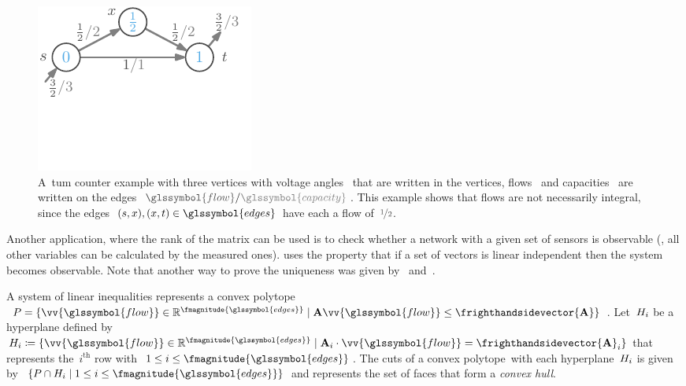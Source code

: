 % 
\begin{figure}%
    \includegraphics[scale=1,page=1]{networkAnalyzes/figures/tum_counter_example.pdf}
    \caption[\gls{tum} counter example.]{%
        A~\gls{tum} counter example with three vertices with
        \textcolor{THETA}{voltage angles~} that are
        written in the vertices, flows~ and
        capacities~ are written on the edges~$
            \textcolor{KITblack70}{\glssymbol{flow}}
            /
            \textcolor{CAPACITY}{\glssymbol{capacity}}
        $. This example shows that flows are not necessarily integral, since the
        edges~$
            (\source, x), 
            (x,\sink)
            \in
            \glssymbol{edges}
        $ have each a flow of~$\textcolor{KITblack70}{\nicefrac{1}{2}}$.
    }%
    \label{ch:network-analyzes:fig:tum-counter-example}%
\end{figure}%
% 
Another application, where the rank of the matrix can be used is to check
whether a network with a given set of sensors is observable (\ie, all other
variables can be calculated by the measured ones). \textcite[p.487;(47)]{Kal59}
uses the property that if a set of vectors is linear independent then the system
becomes observable. Note that another way to prove the uniqueness was given
by~\textcite[p.114; Lemma 4.2.1]{Ver10} and~\textcite[p.361]{Roc84}.

\noindent A system of linear inequalities represents a convex polytope~$
    \polyhedron
    =
    \{
        \vv{\glssymbol{flow}} \in \reals^{\fmagnitude{ \glssymbol{edges} } }
        \mid
        \constraintmatrix
        \vv{ \glssymbol{flow} }
        \leq
        \frighthandsidevector{\constraintmatrix} 
    \}
$. Let~$H_{i}$ be a hyperplane defined by~$
    \cuts_{i} 
    \coloneqq 
    \{
        \vv{\glssymbol{flow}}
        \in
        \reals^{ \fmagnitude{ \glssymbol{edges} } }
        \mid
        \constraintmatrix_i
        \cdot
        \vv{\glssymbol{flow}}
        =
        \frighthandsidevector{\constraintmatrix}_i 
    \}
$ that represents the~$i^{\mathrm{th}}$ row with~$
    1
    \leq 
    i
    \leq
    \fmagnitude{\glssymbol{edges}}
$. The cuts of a convex polytope~\polyhedron with each hyperplane~$H_{i}$ is
given by~$
    \{
        \polyhedron
        \cap
        \cuts_{i}
        \mid
        1 \leq i \leq \fmagnitude{\glssymbol{edges}}
    \}
$ and represents the set of faces that form a \emph{convex hull}. 


